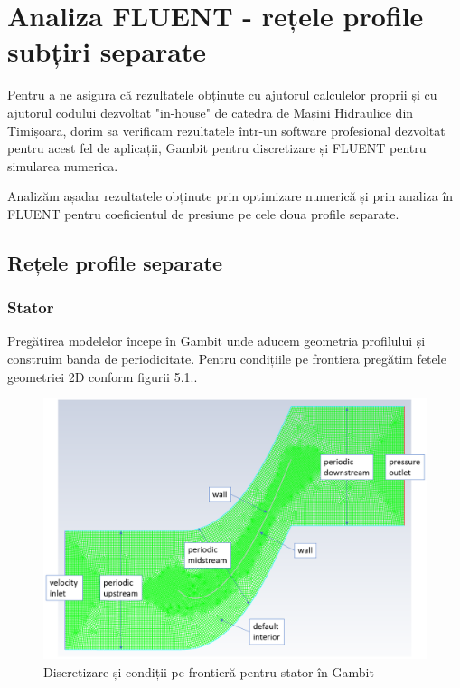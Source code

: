 \chapter{Analiza FLUENT - rețele profile subțiri separate}\label{chapter:analiza}

Pentru a ne asigura că rezultatele obținute cu ajutorul calculelor proprii și cu ajutorul codului dezvoltat "in-house" de catedra de Mașini Hidraulice din Timișoara, dorim sa verificam rezultatele într-un software profesional dezvoltat pentru acest fel de aplicații, Gambit pentru discretizare și FLUENT pentru simularea numerica.

Analizăm așadar rezultatele obținute prin optimizare numerică și prin analiza în FLUENT pentru coeficientul de presiune pe cele doua profile separate.

\section{Rețele profile separate}

\subsection{Stator}

Pregătirea modelelor începe în Gambit unde aducem geometria profilului și construim banda de periodicitate. Pentru condițiile pe frontiera pregătim fetele geometriei 2D conform figurii 5.1..

\begin{figure}[h]
	\centering
	\includegraphics[scale=0.5]{figures/mesh-stator-boundary.PNG}
	\caption{Discretizare și condiții pe frontieră pentru stator în Gambit}
	\label{Discretizare și condiții pe frontieră pentru stator în Gambit}
\end{figure}

